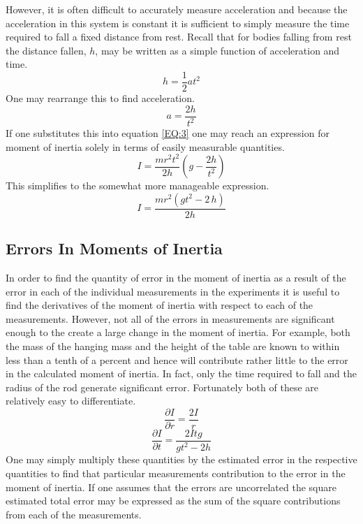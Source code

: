 \documentclass[11pt]{article}
\begin{document}
However, it is often difficult to accurately measure acceleration and because the acceleration in this system is constant it is sufficient to simply measure the time required to fall a fixed distance from rest. Recall that for bodies falling from rest the distance fallen, \(h\), may be written as a simple function of acceleration and time.
\begin{equation}
h = \frac{1}{2}a t^2
\end{equation}
One may rearrange this to find acceleration.
\begin{equation}
a = \frac{2 h}{t^2}
\end{equation}
If one substitutes this into equation \eqref{EQ:3} one may reach an expression for moment of inertia solely in terms of easily measurable quantities.
\begin{equation}
I = {\frac {m{r}^{2}{t}^{2}}{2h} \left( g-{\frac {2h}{{t}^{2}}}
	\right) }
\end{equation}
This simplifies to the somewhat more manageable expression.
\begin{equation}
I = {\frac {m{r}^{2} \left( g{t}^{2}-2\,h \right) }{2h}}
\end{equation}
\subsection{Errors In Moments of Inertia}
In order to find the quantity of error in the moment of inertia as a result of the error in each of the individual measurements in the experiments it is useful to find the derivatives of the moment of inertia with respect to each of the measurements. However, not all of the errors in measurements are significant enough to the create a large change in the moment of inertia. For example, both the mass of the hanging mass and the height of the table are known to within less than a tenth of a percent and hence will contribute rather little to the error in the calculated moment of inertia. In fact, only the time required to fall and the radius of the rod generate significant error. Fortunately both of these are relatively easy to differentiate.
\begin{equation}
\frac{\partial I }{\partial r} = \frac{2I}{r}
\end{equation}
\begin{equation}
\frac{\partial I }{\partial t} = \frac{2Itg}{g t^2-2 h}
\end{equation}
One may simply multiply these quantities by the estimated error in the respective quantities to find that particular measurements contribution to the error in the moment of inertia. If one assumes that the errors are uncorrelated the square estimated total error may be expressed as the sum of the square contributions from each of the measurements.
\end{document}

